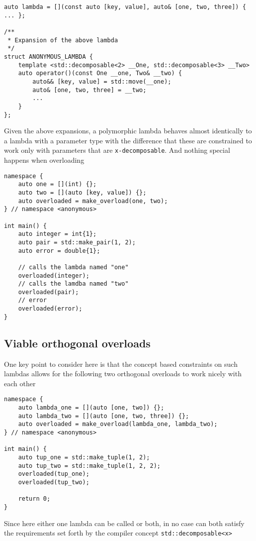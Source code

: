 \documentclass{article}
\begin{document}
\begin{lstlisting}
auto lambda = [](const auto [key, value], auto& [one, two, three]) { ... };

/**
 * Expansion of the above lambda
 */
struct ANONYMOUS_LAMBDA {
    template <std::decomposable<2> __One, std::decomposable<3> __Two>
    auto operator()(const One __one, Two& __two) {
        auto&& [key, value] = std::move(__one);
        auto& [one, two, three] = __two;
        ...
    }
};
\end{lstlisting}

Given the above expansions, a polymorphic lambda behaves almost identically to a
lambda with a  parameter type with the difference that these are
constrained to work only with parameters that are \texttt{x-decomposable}.
And nothing special happens when overloading

\begin{lstlisting}
namespace {
    auto one = [](int) {};
    auto two = [](auto [key, value]) {};
    auto overloaded = make_overload(one, two);
} // namespace <anonymous>

int main() {
    auto integer = int{1};
    auto pair = std::make_pair(1, 2);
    auto error = double{1};

    // calls the lambda named "one"
    overloaded(integer);
    // calls the lamdba named "two"
    overloaded(pair);
    // error
    overloaded(error);
}
\end{lstlisting}

\subsection{Viable orthogonal overloads}
One key point to consider here is that the concept based constraints on such
lambdas allows for the following two orthogonal overloads to work nicely with
each other

\begin{lstlisting}
namespace {
    auto lambda_one = [](auto [one, two]) {};
    auto lambda_two = [](auto [one, two, three]) {};
    auto overloaded = make_overload(lambda_one, lambda_two);
} // namespace <anonymous>

int main() {
    auto tup_one = std::make_tuple(1, 2);
    auto tup_two = std::make_tuple(1, 2, 2);
    overloaded(tup_one);
    overloaded(tup_two);

    return 0;
}
\end{lstlisting}

Since here either one lambda can be called or both, in no case can both
satisfy the requirements set forth by the compiler concept
\texttt{std::decomposable<x>}
\end{document}
